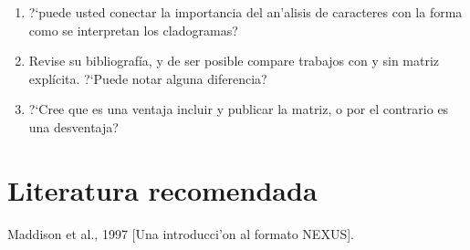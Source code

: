 \begin{enumerate}

	\item ?`puede usted conectar la importancia del an'alisis de caracteres con la forma como se interpretan los cladogramas?

	\item Revise su bibliograf\'ia, y de ser posible compare trabajos con y sin matriz expl\'icita. ?`Puede notar alguna diferencia?

	\item ?`Cree que es una ventaja incluir y publicar la matriz, o por el contrario es una desventaja?\\ 
\end{enumerate}



\section*{Literatura recomendada}  

Maddison et al., 1997 [Una introducci'on al formato NEXUS]. 
